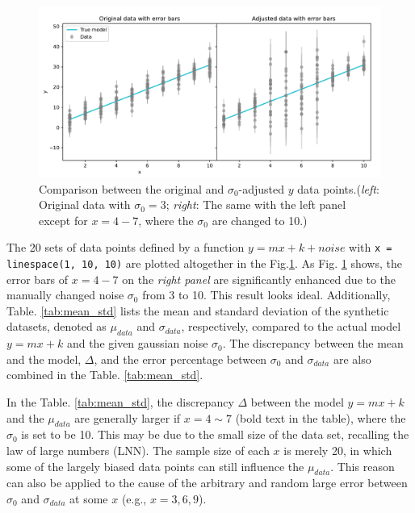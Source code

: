 \documentclass[12pt,a4paper]{article}
\begin{document}
\begin{CJK}{UTF8}{bkai}
\begin{figure}[h]
    \centering
    \includegraphics[width=1\linewidth]{figures/output/output_1_1.pdf}
    \caption{Comparison between the original and $\sigma_0$-adjusted $y$ data points.(\textit{left}: Original data with $\sigma_0=3$; \textit{right}: The same with the left panel except for $x=4-7$, where the $\sigma_0$ are changed to 10.)}
    \label{fig:output_1_1}
\end{figure}

The 20 sets of data points defined by a function \(y = mx + k + noise\) with \texttt{x = linespace(1, 10, 10)} are plotted altogether in the Fig.\ref{fig:output_1_1}. As Fig. \ref{fig:output_1_1} shows, the error bars of $x=4-7$ on the \textit{right panel} are significantly enhanced due to the manually changed noise $\sigma_0$ from 3 to 10. This result looks ideal. 
Additionally, Table. \ref{tab:mean_std} lists the mean and standard deviation of the synthetic datasets, denoted as $\mu_{data}$ and $\sigma_{data}$, respectively, compared to the actual model \(y = mx+k\) and the given gaussian noise $\sigma_0$. The discrepancy between the mean and the model, $\Delta$, and the error percentage between $\sigma_0$ and $\sigma_{data}$ are also combined in the Table. \ref{tab:mean_std}. 

In the Table. \ref{tab:mean_std}, the discrepancy $\Delta$ between the model $y=mx+k$ and the $\mu_{data}$ are generally larger if $x=4\sim7$ (bold text in the table), where the $\sigma_0$ is set to be 10. This may be due to the small size of the data set, recalling the law of large numbers (LNN). The sample size of each $x$ is merely 20, in which some of the largely biased data points can still influence the $\mu_{data}$. This reason can also be applied to the cause of the arbitrary and random large error between $\sigma_0$ and $\sigma_{data}$ at some $x$ (e.g., $ x=3, 6, 9$).


\end{CJK}
\end{document}

